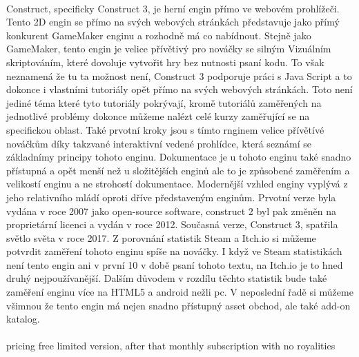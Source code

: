 \paragraph{}
	Construct, specificky Construct 3, je herní engin přímo ve webovém prohlížeči.
	Tento 2D engin se přímo na svých webových stránkách\cite{construct_3_mainpage} představuje jako přímý konkurent GameMaker enginu a rozhodně má co nabídnout.
	Stejně jako GameMaker, tento engin je velice přívětivý pro nováčky se silným Vizuálním skriptováním, které dovoluje vytvořit hry bez nutnosti psaní kodu.
	To však neznamená že tu ta možnost není, Construct 3 podporuje práci s Java Script a to dokonce i vlastními tutoriály\cite{construct_3_tutorials} opět přímo na svých webových stránkách.
	Toto není jediné téma které tyto tutoriály pokrývají, kromě tutoriálů zaměřených na jednotlivé problémy dokonce můžeme nalézt celé kurzy zaměřující se na specifickou oblast.
	Také prvotní kroky jsou s tímto rnginem velice přívětívé nováčkům díky takzvané interaktivní vedené prohlídce\cite{construct_3_interactive_quided_tour}, která seznámí se základnímy principy tohoto enginu.
	Dokumentace\cite{construct_3_documentation} je u tohoto enginu také snadno přístupná a opět menší než u složitějších enginů ale to je způsobené zaměřením a velikostí enginu a ne strohostí dokumentace.
	Modernější vzhled enginy vyplývá z jeho relativního mládí oproti dříve představeným enginům.
	Prvotní verze byla vydána v roce 2007 jako open-source software,  construct 2 byl pak změněn na proprietární licenci a vydán v roce 2012.
	Současná verze, Construct 3, spatřila světlo světa v roce 2017.
	Z porovnání statistik Steam\cite{steamdb_engines} a Itch.io\cite{itch_io_engines} si můžeme potvrdit zaměření tohoto enginu spíše na nováčky.
	I když ve Steam statistikách není tento engin ani v první 10 v době psaní tohoto textu, na Itch.io je to hned druhý nejpoužívanější.
	Dalším důvodem v rozdílu těchto statistik bude také zaměření enginu více na HTML5 a android nežli pc.
	V neposlední řadě si můžeme všimnou že tento engin má nejen snadno přístupný asset obchod, ale také add-on katalog.

\paragraph{}
pricing
free limited version, after that monthly subscription with no royalities


